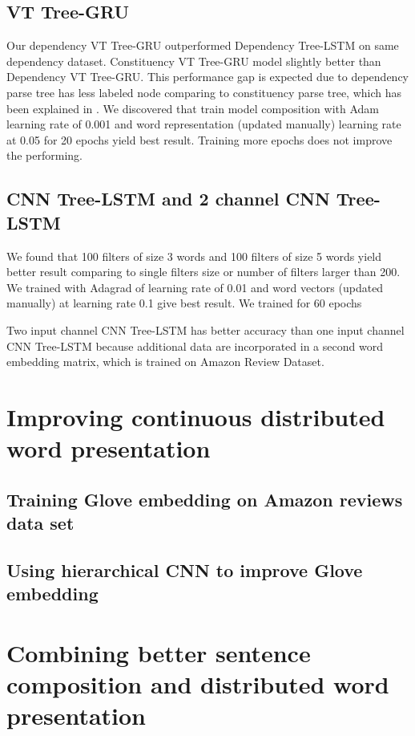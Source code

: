 \subsection{VT Tree-GRU}
Our dependency VT Tree-GRU outperformed Dependency Tree-LSTM on same dependency dataset. Constituency VT Tree-GRU model slightly better than Dependency VT Tree-GRU. This performance gap is expected due to dependency parse tree has less labeled node comparing to constituency parse tree, which has been explained in \cite{treeLSTM}. We discovered that train model composition with Adam learning rate of 0.001 and word representation (updated manually) learning rate at 0.05 for 20 epochs yield best result. Training more epochs does not improve the performing.


\subsection{CNN Tree-LSTM and 2 channel CNN Tree-LSTM}
We found that 100 filters of size 3 words and 100 filters of size 5 words yield better result comparing to single filters size or number of filters larger than 200. We trained with Adagrad of learning rate of 0.01 and word vectors (updated manually) at learning rate 0.1 give best result. We trained for 60 epochs

Two input channel CNN Tree-LSTM has better accuracy than one input channel CNN Tree-LSTM because additional data are incorporated in a second word embedding matrix, which is trained on Amazon Review Dataset.









\section{Improving continuous distributed word presentation}

\subsection{Training Glove embedding on Amazon reviews data set}

\subsection{Using hierarchical CNN to improve Glove embedding}


\section{Combining better sentence composition and distributed word presentation}
